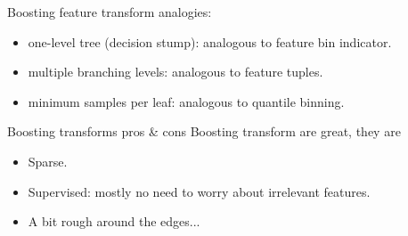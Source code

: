 \documentclass[11pt]{beamer}
\begin{document}
\begin{frame}
Boosting feature transform analogies:
\begin{itemize}
\item one-level tree (decision stump): analogous to feature bin indicator.
\item multiple branching levels: analogous to feature tuples.
\item minimum samples per leaf: analogous to quantile binning.
\end{itemize}
\end{frame}

\begin{frame}{Boosting transforms pros \& cons}
Boosting transform are great, they are 
\begin{itemize}
\item Sparse.
\item Supervised: mostly no need to worry about irrelevant features.
\item A bit rough around the edges...
\end{itemize}
\end{frame}
\end{document}
